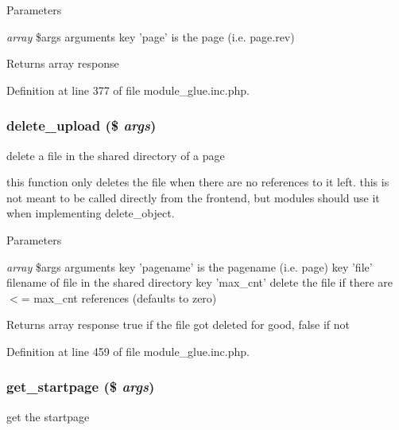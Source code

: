 \begin{DoxyParams}{Parameters}
\item[{\em array}]\$args arguments key 'page' is the page (i.e. page.rev) \end{DoxyParams}
\begin{DoxyReturn}{Returns}
array response 
\end{DoxyReturn}


Definition at line 377 of file module\_\-glue.inc.php.

\hypertarget{module__glue_8inc_8php_aa4865d52ac449f8aaadb3a5d425f2efb}{
\subsubsection[{delete\_\-upload}]{\setlength{\rightskip}{0pt plus 5cm}delete\_\-upload (\$ {\em args})}}
\label{module__glue_8inc_8php_aa4865d52ac449f8aaadb3a5d425f2efb}
delete a file in the shared directory of a page

this function only deletes the file when there are no references to it left. this is not meant to be called directly from the frontend, but modules should use it when implementing delete\_\-object. 
\begin{DoxyParams}{Parameters}
\item[{\em array}]\$args arguments key 'pagename' is the pagename (i.e. page) key 'file' filename of file in the shared directory key 'max\_\-cnt' delete the file if there are $<$= max\_\-cnt references (defaults to zero) \end{DoxyParams}
\begin{DoxyReturn}{Returns}
array response true if the file got deleted for good, false if not 
\end{DoxyReturn}


Definition at line 459 of file module\_\-glue.inc.php.

\hypertarget{module__glue_8inc_8php_a5dd5e5f68b79a78901c25ce850b3eacf}{
\subsubsection[{get\_\-startpage}]{\setlength{\rightskip}{0pt plus 5cm}get\_\-startpage (\$ {\em args})}}
\label{module__glue_8inc_8php_a5dd5e5f68b79a78901c25ce850b3eacf}
get the startpage


